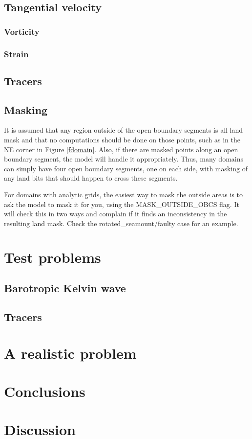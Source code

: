 \documentclass[11pt]{article}
\begin{document}
\subsection{Tangential velocity}

\subsubsection{Vorticity}

\subsubsection{Strain}

\subsection{Tracers}

\subsection{Masking}
It is assumed that any region outside of the open boundary segments
is all land mask and that no computations should be done on those
points, such as in the NE corner in Figure \ref{fdomain}. Also, if
there are masked points along an open boundary segment, the model
will handle it appropriately. Thus, many domains can simply have
four open boundary segments, one on each side, with masking of any
land bits that should happen to cross these segments.

For domains with analytic grids, the easiest way to mask the outside
areas is to ask the model to mask it for you, using the MASK_OUTSIDE_OBCS
flag. It will check this in two ways and complain if it finds an
inconsistency in the resulting land mask. Check the rotated_seamount/faulty
case for an example.

\section{Test problems}
\subsection{Barotropic Kelvin wave}
\subsection{Tracers}
\section{A realistic problem}
\section{Conclusions}
\section{Discussion}



\end{document}
